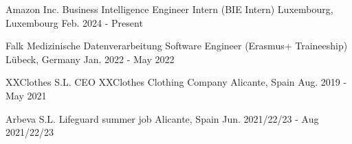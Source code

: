 

\begin{cventries}

  \cventry
    {Amazon Inc.} %
    {Business Intelligence Engineer Intern (BIE Intern)} %
    {Luxembourg, Luxembourg} %
    {Feb. 2024 - Present} %
    {}
    
  \cventry
	{Falk Medizinische Datenverarbeitung} %
	{Software Engineer (Erasmus+ Traineeship)} %
	{Lübeck, Germany} %
	{Jan. 2022 - May 2022} %
	{}
	
  \cventry
	{XXClothes S.L.} %
	{CEO XXClothes Clothing Company} %
	{Alicante, Spain} %
	{Aug. 2019 - May 2021} %
	{}
	
  \cventry
	{Arbeva S.L.} %
	{Lifeguard summer job} %
	{Alicante, Spain} %
	{Jun. 2021/22/23 - Aug 2021/22/23} %
	{}
\end{cventries}
